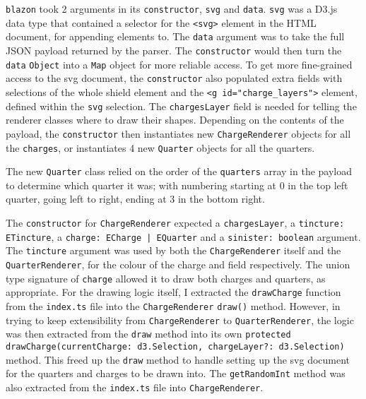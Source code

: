 \documentclass[nobib, a4paper, twoside, justified]{tufte-book}
\makeatletter
\newcommand{\svg}{\gls{svg}\@\xspace}
\newcommand{\charge}{\gls{charge}\@\xspace}
\newcommand{\charges}{\glspl{charge}\@\xspace}
\newcommand{\quarters}{\glspl{quarter}\@\xspace}
\newcommand{\ublazon}{\Gls{blazon}\@\xspace}
\newcommand{\payload}{\gls{payload}\@\xspace}
\makeatother
\begin{document}
 \texttt{\ublazon} took 2 arguments in its
\texttt{constructor}, \texttt{svg} and \texttt{data}. \texttt{svg} was a D3.js~\autocite{d3js}
data type that contained a selector for the \texttt{<svg>} element in the HTML document, for
appending elements to. The \texttt{data} argument was to take the full JSON \payload returned by the
parser. The \texttt{constructor} would then turn the \texttt{data} \texttt{Object} into a
\texttt{Map} object for more reliable access. To get more fine-grained access to the \svg document,
the \texttt{constructor} also populated extra fields with selections of the whole shield element
and the \texttt{<g id="charge\_layers">} element, defined within the \texttt{svg} selection. The
\texttt{chargesLayer} field is needed for telling the renderer classes where to draw their shapes.
Depending on the contents of the \payload, the \texttt{constructor} then instantiates new
\texttt{ChargeRenderer} objects for all the \texttt{\charges}, or instantiates 4 new
\texttt{Quarter} objects for all the \quarters.

The new \texttt{Quarter} class relied on the order of the \texttt{quarters} array in the payload
to determine which quarter it was; with numbering starting at 0 in the top left quarter, going left
to right, ending at 3 in the bottom right.

The \texttt{constructor} for \texttt{ChargeRenderer} expected a \texttt{chargesLayer}, a
\texttt{tincture: ETincture}, a \texttt{charge: ECharge | EQuarter} and a \texttt{sinister:
boolean} argument. The \texttt{tincture} argument was used by both the \texttt{ChargeRenderer}
itself and the \texttt{QuarterRenderer}, for the colour of the \charge and \gls{field}
respectively. The union type signature of \texttt{charge} allowed it to draw both \charges and
\quarters, as appropriate. For the drawing logic itself, I extracted the \texttt{drawCharge}
function from the \texttt{index.ts} file into the \texttt{ChargeRenderer} \texttt{draw()} method.
However, in trying to keep extensibility from \texttt{ChargeRenderer} to \texttt{QuarterRenderer},
the logic was then extracted from the \texttt{draw} method into its own \texttt{protected}
\texttt{drawCharge(currentCharge:~d3.Selection,~chargeLayer?:~d3.Selection)} method. This freed up
the \texttt{draw} method to handle setting up the \svg document for the \quarters and \charges to
be drawn into. The \texttt{getRandomInt} method was also extracted from the \texttt{index.ts} file
into \texttt{ChargeRenderer}.
\end{document}
